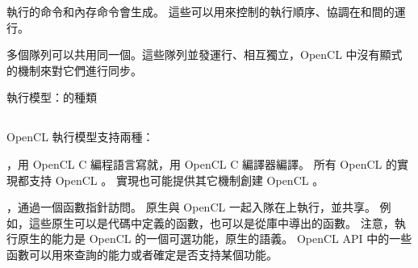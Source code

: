 執行的命令和內存命令會生成。
這些可以用來控制的執行順序、協調在和間的運行。

多個隊列可以共用同一個。這些隊列並發運行、相互獨立，OpenCL 中沒有顯式的機制來對它們進行同步。

\startbuffer[buftitleexecmck]
執行模型：的種類
\stopbuffer
\subsection{\getbuffer[buftitleexecmck]}
OpenCL 執行模型支持兩種：
\startigBase
\item {}，用 OpenCL C 編程語言寫就，用 OpenCL C 編譯器編譯。
所有 OpenCL 的實現都支持 OpenCL 。
實現也可能提供其它機制創建 OpenCL 。

\item {}，通過一個函數指針訪問。
原生與 OpenCL 一起入隊在上執行，並共享。
例如，這些原生可以是代碼中定義的函數，也可以是從庫中導出的函數。
注意，執行原生的能力是 OpenCL 的一個可選功能，原生的語義。
OpenCL API 中的一些函數可以用來查詢的能力或者確定是否支持某個功能。
\stopigBase

